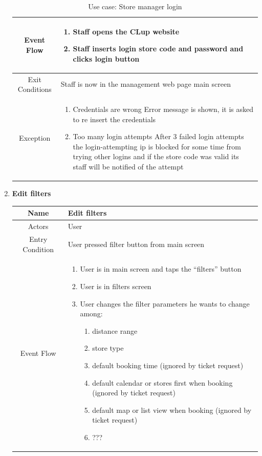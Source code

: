 \begin{enumerate}
\begin{table}[H]
{\begin{tabular}{|c|p{14cm}|}
			Event Flow & \begin{enumerate}
				\item Staff opens the CLup website
				\item Staff inserts login store code and password and clicks login button
				
			\end{enumerate}\\
			
			\hline
			Exit Conditions & Staff is now in the management web page main screen\\
			\hline
			
			Exception & \begin{enumerate}
				\item Credentials are wrong\newline
				Error message is shown, it is asked to re insert the credentials
				\item Too many login attempts\newline
				After 3 failed login attempts the login-attempting ip is blocked for some time from trying other logins and if the store code was valid its staff will be notified of the attempt
				
			\end{enumerate}\\
			
			\hline
		\end{tabular}
	}
	\label{tab:UCManLog}
	\caption{Use case: Store manager login}
\end{table}

\item \textbf{Edit filters}

\begin{table}[H]
	{
		\begin{tabular}{|c|p{14cm}|}
			\hline
			Name & Edit filters\\
			\hline
			Actors & User\\
			\hline
			Entry Condition & User pressed filter button from main screen\\
			\hline
			
			Event Flow & \begin{enumerate}
				\item User is in main screen and taps the “filters” button
				\item User is in filters screen
				\item User changes the filter parameters he wants to change among:
				\begin{enumerate}
					\item distance range
					\item store type
					\item default booking time (ignored by ticket request)
					\item default calendar or stores first when booking (ignored by ticket request)
					\item default map or list view when booking (ignored by ticket request)
					\item ???
				\end{enumerate}
				

\end{enumerate}
\end{tabular}}
\end{table}
\end{enumerate}
